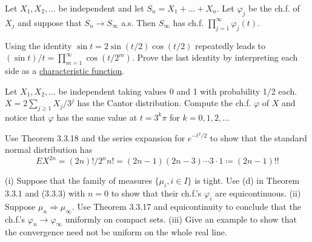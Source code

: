   \begin{exercise}[Durrett 3.3.9]
    Let $X_1, X_2, \dots$ be independent and let $S_n = X_1 + \dots + X_n$. Let $\varphi_j$ be the ch.f. of $X_j$ and suppose that $S_n \to S_\infty$ a.s. Then $S_\infty$ has ch.f. $\prod_{j=1}^\infty \varphi_j(t)$.
  \end{exercise}
  \begin{solution}

  \end{solution}

  \begin{exercise}[Durrett 3.3.10]
    Using the identity $\sin t = 2 \sin(t/2) \cos(t/2)$ repeatedly leads to $(\sin t)/t = \prod_{m=1}^\infty \cos(t/2^m)$. Prove the last identity by interpreting each side as a \hyperref[def:characteristic-function]{characteristic function}.
  \end{exercise}
  \begin{solution}

  \end{solution}

  \begin{exercise}[Durrett 3.3.11]
    Let $X_1, X_2, \dots$ be independent taking values 0 and 1 with probability 1/2 each. $X = 2 \sum_{j \geq 1} X_j/3^j$ has the Cantor distribution. Compute the ch.f. $\varphi$ of $X$ and notice that $\varphi$ has the same value at $t = 3^k\pi$ for $k = 0, 1, 2, \dots$
  \end{exercise}
  \begin{solution}

  \end{solution}

  \begin{exercise}[Durrett 3.3.12]
    Use Theorem 3.3.18 and the series expansion for $e^{-t^2/2}$ to show that the standard normal distribution has
    \begin{equation*}
      EX^{2n} = (2n)!/2^n n! = (2n - 1)(2n - 3) \cdots 3 \cdot 1 \coloneqq (2n - 1)!!
    \end{equation*}
  \end{exercise}
  \begin{solution}

  \end{solution}

  \begin{exercise}[Durrett 3.3.13]
    (i) Suppose that the family of measures $\{\mu_i, i \in I\}$ is tight. Use (d) in Theorem 3.3.1 and (3.3.3) with $n = 0$ to show that their ch.f.'s $\varphi_i$ are equicontinuous. (ii) Suppose $\mu_n \Rightarrow \mu_\infty$. Use Theorem 3.3.17 and equicontinuity to conclude that the ch.f.'s $\varphi_n \to \varphi_\infty$ uniformly on compact sets. (iii) Give an example to show that the convergence need not be uniform on the whole real line.
  \end{exercise}
  \begin{solution}

  \end{solution}

